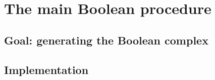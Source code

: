 \documentclass[11pt,oneside]{article}	%
\begin{document}
\section{The main Boolean procedure}

\subsection{Goal: generating the Boolean complex}


\subsection{Implementation}
\end{document}
